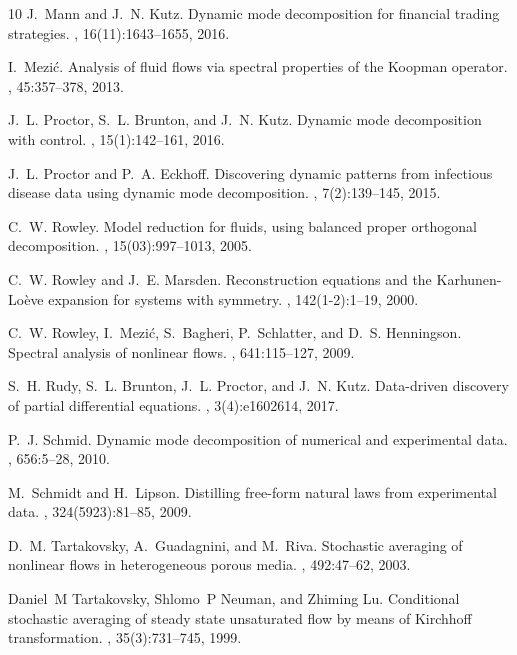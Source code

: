 \documentclass[10pt]{article}
\numberwithin{equation}{section}
\theoremstyle{plain}
\theoremstyle{remark}
\theoremstyle{remark}
\begin{document}
\begin{thebibliography}{10}
J.~Mann and J.~N. Kutz.
\newblock Dynamic mode decomposition for financial trading strategies.
, 16(11):1643--1655, 2016.

I.~Mezi{\'c}.
\newblock Analysis of fluid flows via spectral properties of the {K}oopman
  operator.
, 45:357--378, 2013.

J.~L. Proctor, S.~L. Brunton, and J.~N. Kutz.
\newblock Dynamic mode decomposition with control.
, 15(1):142--161, 2016.

J.~L. Proctor and P.~A. Eckhoff.
\newblock Discovering dynamic patterns from infectious disease data using
  dynamic mode decomposition.
, 7(2):139--145, 2015.

C.~W. Rowley.
\newblock Model reduction for fluids, using balanced proper orthogonal
  decomposition.
, 15(03):997--1013, 2005.

C.~W. Rowley and J.~E. Marsden.
\newblock Reconstruction equations and the {Karhunen-Lo{\`e}ve} expansion for
  systems with symmetry.
, 142(1-2):1--19, 2000.

C.~W. Rowley, I.~Mezi{\'c}, S.~Bagheri, P.~Schlatter, and D.~S. Henningson.
\newblock Spectral analysis of nonlinear flows.
, 641:115--127, 2009.

S.~H. Rudy, S.~L. Brunton, J.~L. Proctor, and J.~N. Kutz.
\newblock Data-driven discovery of partial differential equations.
, 3(4):e1602614, 2017.

P.~J. Schmid.
\newblock Dynamic mode decomposition of numerical and experimental data.
, 656:5--28, 2010.

M.~Schmidt and H.~Lipson.
\newblock Distilling free-form natural laws from experimental data.
, 324(5923):81--85, 2009.

D.~M. Tartakovsky, A.~Guadagnini, and M.~Riva.
\newblock Stochastic averaging of nonlinear flows in heterogeneous porous
  media.
, 492:47--62, 2003.

Daniel~M Tartakovsky, Shlomo~P Neuman, and Zhiming Lu.
\newblock Conditional stochastic averaging of steady state unsaturated flow by
  means of {K}irchhoff transformation.
, 35(3):731--745, 1999.


\end{thebibliography}
\end{document}
